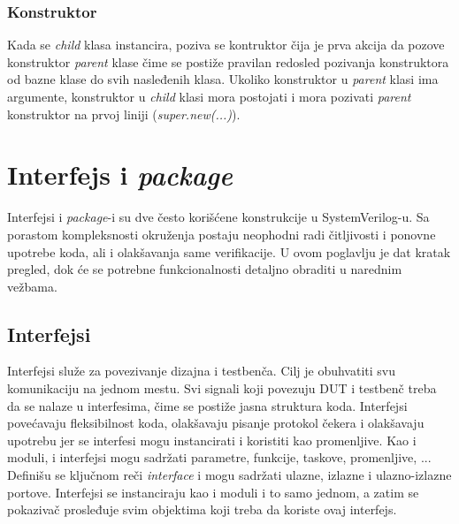\subsubsection{Konstruktor}

Kada se \emph{child} klasa instancira, poziva se kontruktor čija je prva akcija
da pozove konstruktor \emph{parent} klase čime se postiže pravilan redosled
pozivanja konstruktora od bazne klase do svih nasleđenih klasa. Ukoliko
konstruktor u \emph{parent} klasi ima argumente, konstruktor u \emph{child}
klasi mora postojati i mora pozivati \emph{parent} konstruktor na prvoj liniji
(\emph{super.new(...)}).


\section{Interfejs i \emph{package}}

Interfejsi i \emph{package}-i su dve često korišćene konstrukcije u
SystemVerilog-u. Sa porastom kompleksnosti okruženja postaju neophodni radi
čitljivosti i ponovne upotrebe koda, ali i olakšavanja same verifikacije. U ovom
poglavlju je dat kratak pregled, dok će se potrebne funkcionalnosti detaljno
obraditi u narednim vežbama.


\subsection{Interfejsi}

Interfejsi služe za povezivanje dizajna i testbenča. Cilj je obuhvatiti svu
komunikaciju na jednom mestu. Svi signali koji povezuju DUT i testbenč treba da
se nalaze u interfesima, čime se postiže jasna struktura koda. Interfejsi
povećavaju fleksibilnost koda, olakšavaju pisanje protokol čekera i olakšavaju
upotrebu jer se interfesi mogu instancirati i koristiti kao promenljive. Kao i
moduli, i interfejsi mogu sadržati parametre, funkcije, taskove, promenljive,
... Definišu se ključnom reči \emph{interface} i mogu sadržati ulazne, izlazne i
ulazno-izlazne portove. Interfejsi se instanciraju kao i moduli i to samo
jednom, a zatim se pokazivač prosleđuje svim objektima koji treba da koriste
ovaj interfejs.

